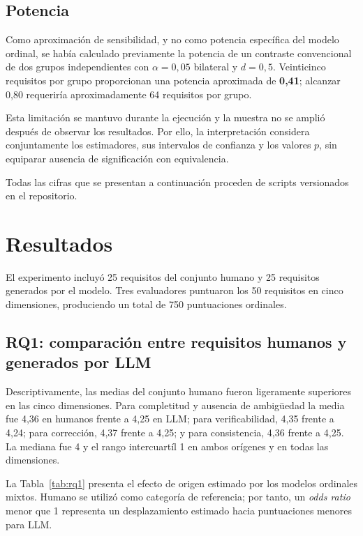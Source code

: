 \documentclass[runningheads]{llncs}
\begin{document}
\subsection{Potencia}

Como aproximaci\'on de sensibilidad, y no como potencia espec\'ifica del modelo
ordinal, se hab\'ia calculado previamente la potencia de un contraste convencional
de dos grupos independientes con $\alpha=0{,}05$ bilateral y $d=0{,}5$.
Veinticinco requisitos por grupo proporcionan una potencia aproximada de
\textbf{0,41}; alcanzar 0,80 requerir\'ia aproximadamente 64 requisitos por grupo.

Esta limitaci\'on se mantuvo durante la ejecuci\'on y la muestra no se ampli\'o
despu\'es de observar los resultados. Por ello, la interpretaci\'on considera
conjuntamente los estimadores, sus intervalos de confianza y los valores $p$, sin
equiparar ausencia de significaci\'on con equivalencia.

Todas las cifras que se presentan a continuaci\'on proceden de scripts
versionados en el repositorio.

\section{Resultados}
\label{sec:resultados}

El experimento incluy\'o 25 requisitos del conjunto humano y 25 requisitos
generados por el modelo. Tres evaluadores puntuaron los 50 requisitos en cinco
dimensiones, produciendo un total de 750 puntuaciones ordinales.

\subsection{RQ1: comparaci\'on entre requisitos humanos y generados por LLM}

Descriptivamente, las medias del conjunto humano fueron ligeramente superiores en
las cinco dimensiones. Para completitud y ausencia de ambig\"uedad la media fue
4,36 en humanos frente a 4,25 en LLM; para verificabilidad, 4,35 frente a 4,24;
para correcci\'on, 4,37 frente a 4,25; y para consistencia, 4,36 frente a 4,25.
La mediana fue 4 y el rango intercuart\'il 1 en ambos or\'igenes y en todas las
dimensiones.

La Tabla~\ref{tab:rq1} presenta el efecto de origen estimado por los modelos
ordinales mixtos. Humano se utiliz\'o como categor\'ia de referencia; por tanto,
un \emph{odds ratio} menor que 1 representa un desplazamiento estimado hacia
puntuaciones menores para LLM.
\end{document}

